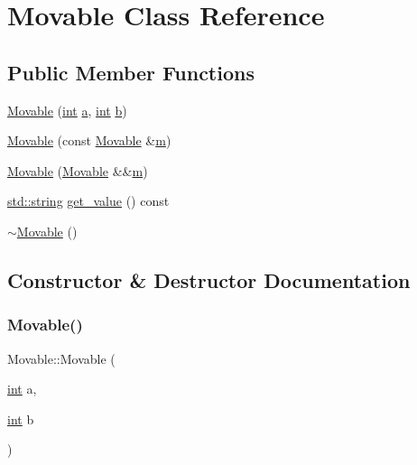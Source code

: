 \hypertarget{class_movable}{}\section{Movable Class Reference}
\label{class_movable}
\subsection*{Public Member Functions}
\begin{DoxyCompactItemize}
\item 
\mbox{\hyperlink{class_movable_aa0c9bc00cc2cbdf25ed859c027ad5cc0}{Movable}} (\mbox{\hyperlink{warnings_8h_a74f207b5aa4ba51c3a2ad59b219a423b}{int}} \mbox{\hyperlink{_s_d_l__opengl__glext_8h_a3309789fc188587d666cda5ece79cf82}{a}}, \mbox{\hyperlink{warnings_8h_a74f207b5aa4ba51c3a2ad59b219a423b}{int}} \mbox{\hyperlink{_s_d_l__opengl__glext_8h_a0f71581a41fd2264c8944126dabbd010}{b}})
\item 
\mbox{\hyperlink{class_movable_a718088f2949b66089c8d6178cec6d96e}{Movable}} (const \mbox{\hyperlink{class_movable}{Movable}} \&\mbox{\hyperlink{_s_d_l__opengl__glext_8h_af593500c283bf1a787a6f947f503a5c2}{m}})
\item 
\mbox{\hyperlink{class_movable_a8c592922bdd171320f54e74a1cf28e2e}{Movable}} (\mbox{\hyperlink{class_movable}{Movable}} \&\&\mbox{\hyperlink{_s_d_l__opengl__glext_8h_af593500c283bf1a787a6f947f503a5c2}{m}})
\item 
\mbox{\hyperlink{_s_d_l__opengl__glext_8h_ab4ccfaa8ab0e1afaae94dc96ef52dde1}{std\+::string}} \mbox{\hyperlink{class_movable_a1369a0903e539801e447c9335ff0523b}{get\+\_\+value}} () const
\item 
\mbox{\hyperlink{class_movable_ac75d653d5762a163b6804d6cccc6fc9c}{$\sim$\+Movable}} ()
\end{DoxyCompactItemize}


\subsection{Constructor \& Destructor Documentation}
\mbox{\label{class_movable_aa0c9bc00cc2cbdf25ed859c027ad5cc0}} 
\subsubsection{\texorpdfstring{Movable()}{Movable()}\hspace{0.1cm}{\footnotesize\ttfamily [1/3]}}
{\footnotesize\ttfamily Movable\+::\+Movable (\begin{DoxyParamCaption}\item[{\mbox{\hyperlink{warnings_8h_a74f207b5aa4ba51c3a2ad59b219a423b}{int}}}]{a,  }\item[{\mbox{\hyperlink{warnings_8h_a74f207b5aa4ba51c3a2ad59b219a423b}{int}}}]{b }\end{DoxyParamCaption})\hspace{0.3cm}{\ttfamily [inline]}}

